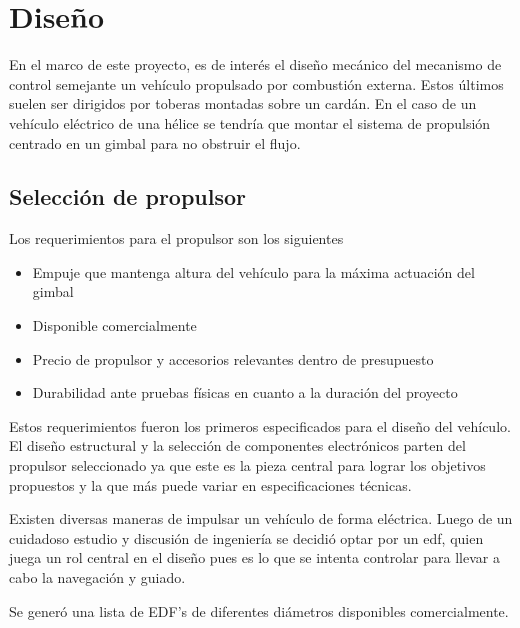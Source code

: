 \section{Diseño}

En el marco de este proyecto, es de interés el diseño mecánico del mecanismo de control semejante un vehículo propulsado por combustión externa. Estos últimos suelen ser dirigidos por toberas montadas sobre un cardán. En el caso de un vehículo eléctrico de una hélice se tendría que montar el sistema de propulsión centrado en un gimbal para no obstruir el flujo.

\subsection{Selección de propulsor}

Los requerimientos para el propulsor son los siguientes

\begin{itemize}
    \item Empuje que mantenga altura del vehículo para la máxima actuación del gimbal
    \item Disponible comercialmente
    \item Precio de propulsor y accesorios relevantes dentro de presupuesto
    \item Durabilidad ante pruebas físicas en cuanto a la duración del proyecto
\end{itemize}

Estos requerimientos fueron los primeros especificados para el diseño del vehículo. El diseño estructural y la selección de componentes electrónicos parten del propulsor seleccionado ya que este es la pieza central para lograr los objetivos propuestos y la que más puede variar en especificaciones técnicas.

\medskip 

Existen diversas maneras de impulsar un vehículo de forma eléctrica. Luego de un cuidadoso estudio y discusión de ingeniería se decidió optar por un \gls{edf}, quien juega un rol central en el diseño pues es lo que se intenta controlar para llevar a cabo la navegación y guiado.


\medskip

Se generó una lista de EDF's de diferentes diámetros disponibles comercialmente.

